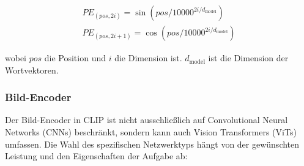 \documentclass[nolibertine, ngerman, algorithm, nomencl, minted]{ttlab-qualify}
\begin{document}
\begin{align*}
	PE_{(pos, 2i)} = \sin\left(pos / 10000^{2i/d_{\text{model}}}\right) \\
	PE_{(pos, 2i+1)} = \cos\left(pos / 10000^{2i/d_{\text{model}}}\right)
\end{align*}

wobei $pos$ die Position und $i$ die Dimension ist. $d_{\text{model}}$ ist die Dimension der Wortvektoren.

\subsubsection{Bild-Encoder}
Der Bild-Encoder in CLIP ist nicht ausschließlich auf Convolutional Neural Networks (CNNs) beschränkt, sondern kann auch Vision Transformers (ViTs) umfassen. Die Wahl des spezifischen Netzwerktyps hängt von der gewünschten Leistung und den Eigenschaften der Aufgabe ab:
\end{document}
